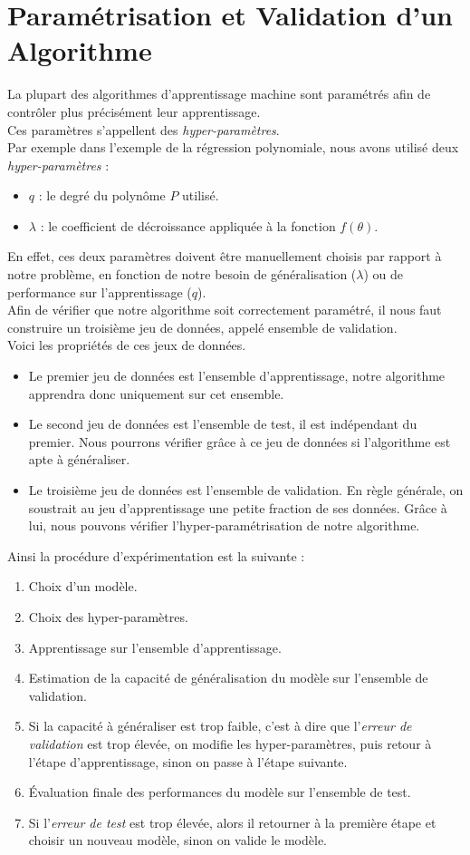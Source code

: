 \documentclass[10pt,a4paper]{report}
\begin{document}
	\section{Paramétrisation et Validation d'un Algorithme}
	La plupart des algorithmes d'apprentissage machine sont paramétrés afin de contrôler plus précisément leur apprentissage.\\
	Ces paramètres s'appellent des \emph{hyper-paramètres}.\\
	Par exemple dans l'exemple de la régression polynomiale, nous avons utilisé deux \emph{hyper-paramètres} :
	\begin{itemize}
		\item $q$ : le degré du polynôme $P$ utilisé.
		\item $\lambda$ : le coefficient de décroissance appliquée à la fonction $f(\theta)$.
	\end{itemize}
	En effet, ces deux paramètres doivent être manuellement choisis par rapport à notre problème, en fonction de notre besoin de généralisation ($\lambda$) ou de performance sur l'apprentissage ($q$).\\
	Afin de vérifier que notre algorithme soit correctement paramétré, il nous faut construire un troisième jeu de données, appelé ensemble de validation.\\
	Voici les propriétés de ces jeux de données.
	\begin{itemize}
		\item Le premier jeu de données est l'ensemble d'apprentissage, notre algorithme apprendra donc uniquement sur cet ensemble.
		\item Le second jeu de données est l'ensemble de test, il est indépendant du premier. Nous pourrons vérifier grâce à ce jeu de données si l'algorithme est apte à généraliser.
		\item Le troisième jeu de données est l'ensemble de validation. En règle générale, on soustrait au jeu d'apprentissage une petite fraction de ses données. Grâce à lui, nous pouvons vérifier l'hyper-paramétrisation de notre algorithme.
	\end{itemize}
	Ainsi la procédure d'expérimentation est la suivante :
	\begin{enumerate}
		\item Choix d'un modèle.
		\item Choix des hyper-paramètres.
		\item Apprentissage sur l'ensemble d'apprentissage.
		\item Estimation de la capacité de généralisation du modèle sur l'ensemble de validation.
		\item Si la capacité à généraliser est trop faible, c'est à dire que l'\emph{erreur de validation} est trop élevée, on modifie les hyper-paramètres, puis retour à l'étape d'apprentissage, sinon on passe à l'étape suivante.
		\item Évaluation finale des performances du modèle sur l'ensemble de test.
		\item Si l'\emph{erreur de test} est trop élevée, alors il retourner à la première étape et choisir un nouveau modèle, sinon on valide le modèle.
	\end{enumerate}
	
\end{document}
